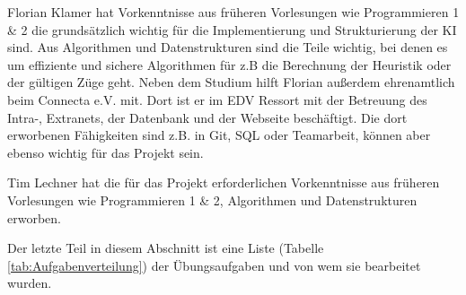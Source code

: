 \documentclass[12pt,a4paper,bibliography=totocnumbered,listof=totocnumbered]{scrartcl}
\begin{document}
    Florian Klamer hat Vorkenntnisse aus früheren Vorlesungen wie Programmieren 1 \& 2 die grundsätzlich wichtig für die Implementierung und Strukturierung der KI sind. Aus Algorithmen und Datenstrukturen sind die Teile wichtig, bei denen es um effiziente und sichere Algorithmen für z.B die Berechnung der Heuristik oder der gültigen Züge geht. Neben dem Studium hilft Florian außerdem ehrenamtlich beim Connecta e.V. mit. Dort ist er im EDV Ressort mit der Betreuung des Intra-, Extranets, der Datenbank und der Webseite beschäftigt. Die dort erworbenen Fähigkeiten sind z.B. in Git, SQL oder Teamarbeit, können aber ebenso wichtig für das Projekt sein.

    Tim Lechner hat die für das Projekt erforderlichen Vorkenntnisse aus früheren Vorlesungen wie Programmieren 1 \& 2, Algorithmen und Datenstrukturen erworben. 
    

    Der letzte Teil in diesem Abschnitt ist eine Liste (Tabelle \ref{tab:Aufgabenverteilung}) der Übungsaufgaben und von wem sie bearbeitet wurden.\newline
\end{document}
